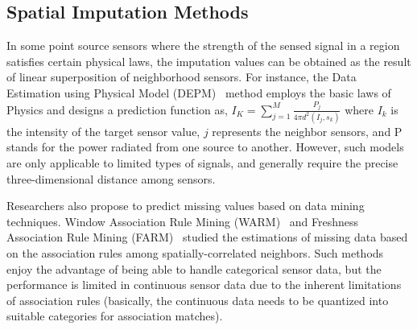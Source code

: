 \subsection{Spatial Imputation Methods}
In some point source sensors where the strength of the sensed signal in a region satisfies certain physical laws, the imputation values can be obtained as the result of linear superposition of neighborhood sensors.
For instance, the Data Estimation using Physical Model (DEPM)~\cite{li2008data} method employs the basic laws of Physics and 
designs a prediction function as,  
$I_K =\sum_{j=1}^M\frac{P_j}{4\pi d^2(I_j,s_k)}$
where $I_k$ is the intensity of the target sensor value, $j$ represents the neighbor sensors, and P stands for the power radiated from one source to another. 
However, such models are only applicable to limited types of signals, and generally require the precise three-dimensional distance among sensors.

Researchers also propose to predict missing values based on data mining techniques. Window Association Rule Mining (WARM)~\cite{le2005estimating} and Freshness Association Rule Mining (FARM)~\cite{Gruenwald:FARM} studied the estimations of missing data based on the association rules among spatially-correlated neighbors. 
Such methods enjoy the advantage of being able to handle categorical sensor data, but the performance is limited in continuous sensor data due to the inherent limitations of association rules (basically, the continuous data needs to be quantized into suitable
categories for association matches).

